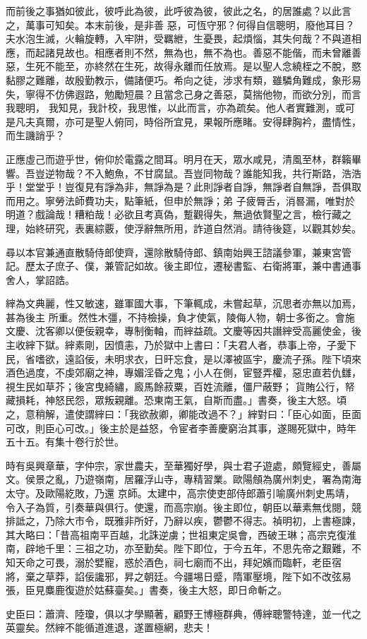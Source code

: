 \begin{pinyinscope}
 而前後之事猶如彼此，彼呼此為彼，此呼彼為彼，彼此之名，的居誰處？以此言之，萬事可知矣。本末前後，是非善
 惡，可恆守邪？何得自信聰明，廢他耳目？夫水泡生滅，火輪旋轉，入牢阱，受羈紲，生憂畏，起煩惱，其失何哉？不與道相應，而起諸見故也。相應者則不然，無為也，無不為也。善惡不能偕，而未曾離善惡，生死不能至，亦終然在生死，故得永離而任放焉。是以聖人念繞桎之不脫，愍黏膠之難離，故殷勤教示，備諸便巧。希向之徒，涉求有類，雖驎角難成，象形易失，寧得不仿佛遐路，勉勵短晨？且當念己身之善惡，莫揣他物，而欲分別，而言我聰明，
 我知見，我計校，我思惟，以此而言，亦為疏矣。他人者實難測，或可是凡夫真爾，亦可是聖人俯同，時俗所宜見，果報所應睹。安得肆胸衿，盡情性，而生譏誚乎？



 正應虛己而遊乎世，俯仰於電露之間耳。明月在天，眾水咸見，清風至林，群籟畢響。吾豈逆物哉？不入鮑魚，不甘腐鼠。吾豈同物哉？誰能知我，共行斯路，浩浩乎！堂堂乎！豈復見有諍為非，無諍為是？此則諍者自諍，無諍者自無諍，吾俱取而用之。寧勞法師費功夫，點筆紙，但申於無諍；弟
 子疲脣舌，消晷漏，唯對於明道？戲論哉！糟粕哉！必欲且考真偽，蹔觀得失，無過依賢聖之言，檢行藏之理，始終研究，表裏綜覈，使浮辭無所用，詐道自然消。請待後筵，以觀其妙矣。



 尋以本官兼通直散騎侍郎使齊，還除散騎侍郎、鎮南始興王諮議參軍，兼東宮管記。歷太子庶子、僕，兼管記如故。後主即位，遷秘書監、右衛將軍，兼中書通事舍人，掌詔誥。



 縡為文典麗，性又敏速，雖軍國大事，下筆輒成，未嘗起草，沉思者亦無以加焉，甚為後主
 所重。然性木彊，不持檢操，負才使氣，陵侮人物，朝士多銜之。會施文慶、沈客卿以便佞親幸，專制衡軸，而縡益疏。文慶等因共譖縡受高麗使金，後主收縡下獄。縡素剛，因憤恚，乃於獄中上書曰：「夫君人者，恭事上帝，子愛下民，省嗜欲，遠諂佞，未明求衣，日旰忘食，是以澤被區宇，慶流子孫。陛下頃來酒色過度，不虔郊廟之神，專媚淫昏之鬼；小人在側，宦豎弄權，惡忠直若仇讎，視生民如草芥；後宮曳綺繡，廄馬餘菽粟，百姓流離，僵尸蔽野；
 貨賄公行，帑藏損耗，神怒民怨，眾叛親離。恐東南王氣，自斯而盡。」書奏，後主大怒。頃之，意稍解，遣使謂縡曰：「我欲赦卿，卿能改過不？」縡對曰：「臣心如面，臣面可改，則臣心可改。」後主於是益怒，令宦者李善慶窮治其事，遂賜死獄中，時年五十五。有集十卷行於世。



 時有吳興章華，字仲宗，家世農夫，至華獨好學，與士君子遊處，頗覽經史，善屬文。侯景之亂，乃遊嶺南，居羅浮山寺，專精習業。歐陽頠為廣州刺史，署為南海太守。及歐陽紇敗，乃還
 京師。太建中，高宗使吏部侍郎蕭引喻廣州刺史馬靖，令入子為質，引奏華與俱行。使還，而高宗崩。後主即位，朝臣以華素無伐閱，競排詆之，乃除大市令，既雅非所好，乃辭以疾，鬱鬱不得志。禎明初，上書極諫，其大略曰：「昔高祖南平百越，北誅逆虜；世祖東定吳會，西破王琳；高宗克復淮南，辟地千里：三祖之功，亦至勤矣。陛下即位，于今五年，不思先帝之艱難，不知天命之可畏，溺於嬖寵，惑於酒色，祠七廟而不出，拜妃嬪而臨軒，老臣宿
 將，棄之草莽，諂佞讒邪，昇之朝廷。今疆埸日蹙，隋軍壓境，陛下如不改弦易張，臣見麋鹿復遊於姑蘇臺矣。」書奏，後主大怒，即日命斬之。



 史臣曰：蕭濟、陸瓊，俱以才學顯著，顧野王博極群典，傅縡聰警特達，並一代之英靈矣。然縡不能循道進退，遂置極網，悲夫！



\end{pinyinscope}